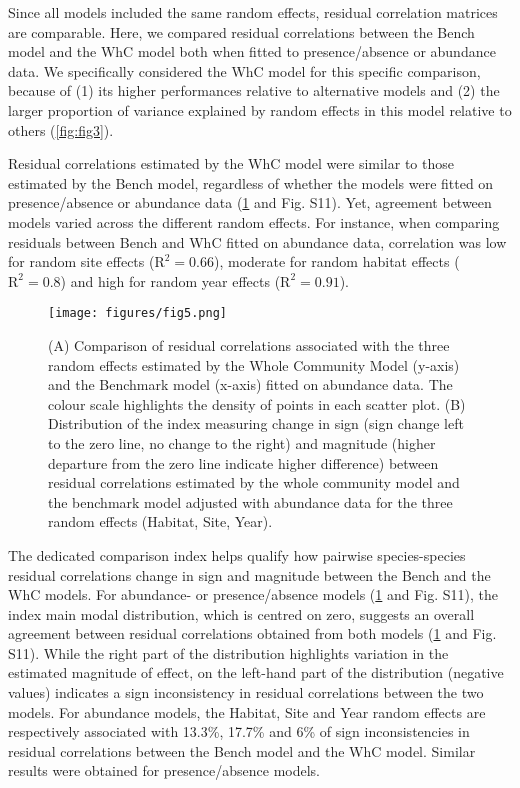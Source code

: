 \documentclass[9pt,biorxiv,doublespacing,lineno]{lapreprint}
\begin{document}
Since all models included the same random effects, residual correlation
matrices are comparable. Here, we compared residual correlations between
the Bench model and the WhC model both when fitted to presence/absence
or abundance data. We specifically considered the WhC model for this
specific comparison, because of (1) its higher performances relative to
alternative models and (2) the larger proportion of variance explained
by random effects in this model relative to others (\cref{fig:fig3}).

Residual correlations estimated by the WhC model were similar to those
estimated by the Bench model, regardless of whether the models were
fitted on presence/absence or abundance data (\cref{fig:fig5} and Fig.
S11). Yet, agreement between models varied across the different random
effects. For instance, when comparing residuals between Bench and WhC
fitted on abundance data, correlation was low for random site effects
(\(\text{R}^2 = 0.66\)), moderate for random habitat effects
(\(\text{R}^2 = 0.8\)) and high for random year effects
(\(\text{R}^2 = 0.91\)).

\begin{figure}
\hypertarget{fig:fig5}{%
\centering
\texttt{[image: figures/fig5.png]}
\caption{(A) Comparison of residual correlations associated with the
three random effects estimated by the Whole Community Model (y-axis) and
the Benchmark model (x-axis) fitted on abundance data. The colour scale
highlights the density of points in each scatter plot. (B) Distribution
of the index measuring change in sign (sign change left to the zero
line, no change to the right) and magnitude (higher departure from the
zero line indicate higher difference) between residual correlations
estimated by the whole community model and the benchmark model adjusted
with abundance data for the three random effects (Habitat, Site,
Year).}\label{fig:fig5}
}
\end{figure}

The dedicated comparison index helps qualify how pairwise
species-species residual correlations change in sign and magnitude
between the Bench and the WhC models. For abundance- or presence/absence
models (\cref{fig:fig5} and Fig. S11), the index main modal
distribution, which is centred on zero, suggests an overall agreement
between residual correlations obtained from both models (\cref{fig:fig5}
and Fig. S11). While the right part of the distribution highlights
variation in the estimated magnitude of effect, on the left-hand part of
the distribution (negative values) indicates a sign inconsistency in
residual correlations between the two models. For abundance models, the
Habitat, Site and Year random effects are respectively associated with
13.3\%, 17.7\% and 6\% of sign inconsistencies in residual correlations
between the Bench model and the WhC model. Similar results were obtained
for presence/absence models.
\end{document}
